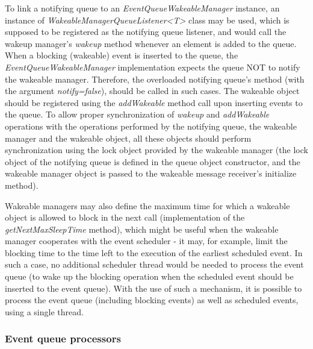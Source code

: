 To link a notifying queue to an \emph{EventQueueWakeableManager} instance, an instance of \emph{WakeableManagerQueueListener<T> } class may be used, which is supposed to be registered as the notifying queue listener, and would call the wakeup manager's \emph{wakeup} method whenever an element is added to the queue. When a blocking (wakeable) event is inserted to the queue, the \emph{EventQueueWakeableManager} implementation expects the queue NOT to notify the wakeable manager. Therefore, the overloaded notifying queue's method (with the argument \emph{notify=false}), should be called in such cases. The wakeable object should be registered using the \emph{addWakeable} method call upon inserting events to the queue. To allow proper synchronization of \emph{wakeup} and \emph{addWakeable} operations with the operations performed by the notifying queue, the wakeable manager and the wakeable object, all these objects should perform synchronization using the lock object provided by the wakeable manager (the lock object of the notifying queue is defined in the queue object constructor, and the wakeable manager object is passed to the wakeable message receiver's initialize method).

Wakeable managers may also define the maximum time for which a wakeable object is allowed to block in the next call (implementation of the \emph{getNextMaxSleepTime} method), which might be useful when the wakeable manager cooperates with the event scheduler - it may, for example, limit the blocking time to the time left to the execution of the earliest scheduled event. In such a case, no additional scheduler thread would be needed to process the event queue (to wake up the blocking operation when the scheduled event should be inserted to the event queue). With the use of such a mechanism, it is possible to process the event queue (including blocking events) as well as scheduled events, using a single thread.













\subsubsection{Event queue processors}
\label{sec:libEventProcessors}

